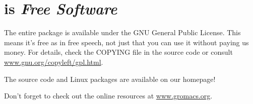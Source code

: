 \documentclass[11pt,a4paper,twoside]{gmxmanual}
\newcommand{\wwwpage}{\href{http://www.gromacs.org}{www.gromacs.org}}
\begin{document}
\section*{{\gromacs} is {\em Free Software}}
The entire {\gromacs} package is available under the GNU 
General Public License. This means it's free as 
in free speech, not just that you can use it without
paying us money. For details, check the COPYING file in the source code
or consult 
\href{http://www.gnu.org/copyleft/gpl.html}{www.gnu.org/copyleft/gpl.html}.

The {\gromacs} source code and 
Linux packages are available on our homepage!


\vspace{0.5cm}

%
%
\tableofcontents
\listoffigures
\listoftables

%
%
\cleardoublepage
{}










%
%
\appendix






%


%
%
\cleardoublepage
{}





%
%
\cleardoublepage
{}

\renewcommand{\see}[2]{\mbox{} \mbox{\textit{see} #1}}
\printindex

\newpage
\pagestyle{empty}
\phantom{ }

\vfill

\begin{center}
Don't forget to check out the online resources at \wwwpage.
\end{center}
\cleardoublepage
\end{document}
